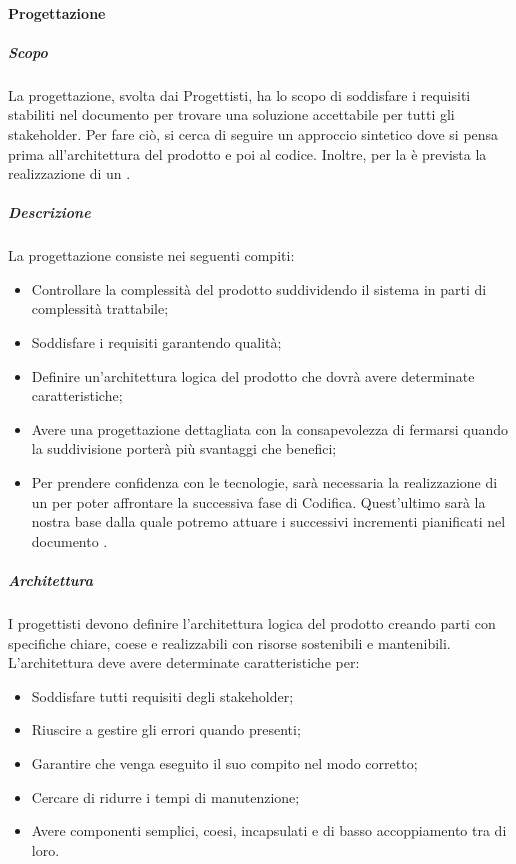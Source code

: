 \paragraph{Progettazione}
\subparagraph*{Scopo}
La progettazione, svolta dai Progettisti, ha lo scopo di soddisfare i requisiti stabiliti nel documento \AdR{} per trovare una soluzione accettabile per tutti gli stakeholder.
Per fare ciò, si cerca di seguire un approccio sintetico dove si pensa prima all’architettura del prodotto e poi al codice. 
Inoltre, per la  è prevista la realizzazione di un .

\subparagraph*{Descrizione}
La progettazione consiste nei seguenti compiti:
\begin{itemize}
	\item Controllare la complessità del prodotto suddividendo il sistema in parti di complessità trattabile;
	\item Soddisfare i requisiti garantendo qualità;
	\item Definire un’architettura logica del prodotto che dovrà avere determinate caratteristiche;
	\item Avere una progettazione dettagliata con la consapevolezza di fermarsi quando la suddivisione porterà più svantaggi che benefici;
	\item Per prendere confidenza con le tecnologie, sarà necessaria la realizzazione di un  per poter affrontare la successiva fase di Codifica. Quest'ultimo sarà la nostra base dalla quale potremo attuare i successivi incrementi pianificati nel documento \PdP{}.
\end{itemize}

\subparagraph*{Architettura}
I progettisti devono definire l’architettura logica del prodotto creando parti con specifiche chiare, coese e realizzabili con risorse sostenibili e mantenibili. L'architettura deve avere determinate caratteristiche per:
\begin{itemize}
	\item Soddisfare tutti requisiti degli stakeholder;
	\item Riuscire a gestire gli errori quando presenti;
	\item Garantire che venga eseguito il suo compito nel modo corretto;
	\item Cercare di ridurre i tempi di manutenzione;
	\item Avere componenti semplici, coesi, incapsulati e di basso accoppiamento tra di loro.
\end{itemize}

